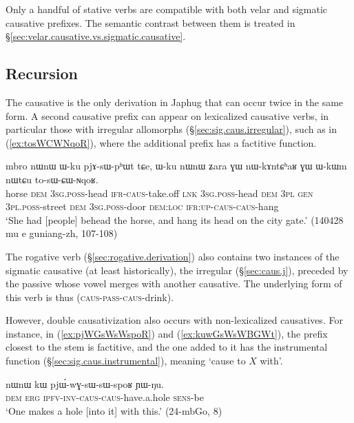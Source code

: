 Only a handful of  stative verbs are compatible with both velar and sigmatic causative prefixes. The semantic contrast between them is treated in §\ref{sec:velar.causative.vs.sigmatic.causative}.
    
\subsection{Recursion} \label{sec:sig.caus.other.recursion}
The causative is the only derivation in Japhug that can occur twice in the same form. A second causative prefix can appear on lexicalized causative verbs, in particular those with irregular allomorphs (§\ref{sec:sig.caus.irregular}), such as  in (\ref{ex:tosWCWNqoR}), where the additional  prefix has a factitive function. 

\begin{exe}
\ex \label{ex:tosWCWNqoR}
\gll mbro nɯnɯ ɯ-ku pjɤ-sɯ-pʰɯt tɕe, ɯ-ku nɯnɯ ʑara ɣɯ nɯ-kɤntɕʰaʁ ɣɯ ɯ-kɯm nɯtɕu to-sɯ-ɕɯ-ɴqoʁ. \\
horse \textsc{dem} \textsc{3sg}.\textsc{poss}-head \textsc{ifr}-\textsc{caus}-take.off \textsc{lnk} \textsc{3sg}.\textsc{poss}-head \textsc{dem} \textsc{3pl} \textsc{gen} \textsc{3pl}.\textsc{poss}-street \textsc{dem} \textsc{3sg}.\textsc{poss}-door \textsc{dem}:\textsc{loc} \textsc{ifr}:\textsc{up}-\textsc{caus}-\textsc{caus}-hang \\
\glt `She had [people] behead the horse, and hang its head on the city gate.' (140428 mu e guniang-zh, 107-108)
  \end{exe} 
  
The rogative verb   (§\ref{sec:rogative.derivation}) also contains two instances of the sigmatic causative (at least historically), the irregular  (§\ref{sec:caus.j}), preceded by the passive  whose vowel merges with another causative. The underlying form of this verb is thus  (\textsc{caus}-\textsc{pass}-\textsc{caus}-drink).

However, double causativization also occurs with non-lexicalized causatives. For instance, in (\ref{ex:pjWGsWsWspoR}) and (\ref{ex:kuwGsWsWBGWt}), the  prefix closest to the stem is factitive, and the one added to it has the instrumental function (§\ref{sec:sig.caus.instrumental}), meaning  `cause to $X$ with'. 

\begin{exe}
\ex \label{ex:pjWGsWsWspoR}
\gll nɯnɯ kɯ pjɯ́-wɣ-sɯ-sɯ-spoʁ ɲɯ-ŋu. \\
\textsc{dem} \textsc{erg} \textsc{ipfv}-\textsc{inv}-\textsc{caus}-\textsc{caus}-have.a.hole \textsc{sens}-be \\
\glt `One makes a hole [into it] with this.' (24-mbGo, 8)
 \end{exe} 
 
